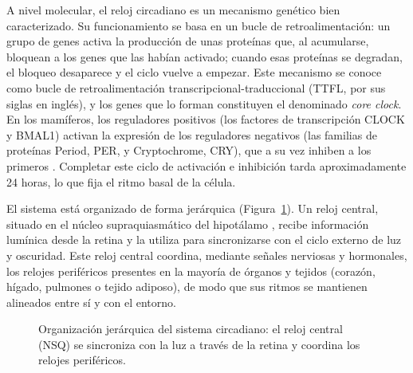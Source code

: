 \documentclass[12pt, a4paper]{report}
\begin{document}
A nivel molecular, el reloj circadiano es un mecanismo genético bien caracterizado. Su funcionamiento se basa en un bucle de retroalimentación: un grupo de genes activa la producción de unas proteínas que, al acumularse, bloquean a los genes que las habían activado; cuando esas proteínas se degradan, el bloqueo desaparece y el ciclo vuelve a empezar. Este mecanismo se conoce como bucle de retroalimentación transcripcional-traduccional (TTFL, por sus siglas en inglés), y los genes que lo forman constituyen el denominado \textit{core clock}. En los mamíferos, los reguladores positivos (los factores de transcripción CLOCK y BMAL1) activan la expresión de los reguladores negativos (las familias de proteínas Period, PER, y Cryptochrome, CRY), que a su vez inhiben a los primeros \cite{takahashi2017}. Completar este ciclo de activación e inhibición tarda aproximadamente 24 horas, lo que fija el ritmo basal de la célula.

El sistema está organizado de forma jerárquica (Figura~\ref{fig:jerarquia}). Un reloj central, situado en el núcleo supraquiasmático del hipotálamo \cite{klein1991}, recibe información lumínica desde la retina y la utiliza para sincronizarse con el ciclo externo de luz y oscuridad. Este reloj central coordina, mediante señales nerviosas y hormonales, los relojes periféricos presentes en la mayoría de órganos y tejidos (corazón, hígado, pulmones o tejido adiposo), de modo que sus ritmos se mantienen alineados entre sí y con el entorno.

\begin{figure}[htbp]
\centering
{}
\caption[Organización jerárquica del sistema circadiano.]{Organización jerárquica del sistema circadiano: el reloj central (NSQ) se sincroniza con la luz a través de la retina y coordina los relojes periféricos.}
\label{fig:jerarquia}
\end{figure}
\end{document}

